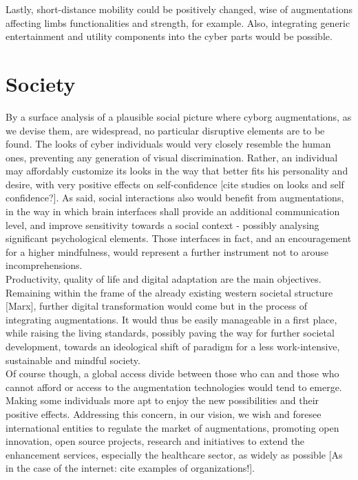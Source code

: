 Lastly, short-distance mobility could be positively changed, wise of augmentations affecting limbs functionalities and strength, for example. Also, integrating generic entertainment and utility components into the cyber parts would be possible.


\section*{Society}
\label{sec:society}

By a surface analysis of a plausible social picture where cyborg augmentations, as we devise them, are widespread, no particular disruptive elements are to be found. The looks of cyber individuals would very closely resemble the human ones, preventing any generation of visual discrimination. Rather, an individual may affordably customize its looks in the way that better fits his personality and desire, with very positive effects on self-confidence [cite studies on looks and self confidence?]. As said, social interactions also would benefit from augmentations, in the way in which brain interfaces shall provide an additional communication level, and improve sensitivity towards a social context - possibly analysing significant psychological elements. Those interfaces in fact, and an encouragement for a higher mindfulness, would represent a further instrument not to arouse incomprehensions.\\

Productivity, quality of life and digital adaptation are the main objectives. Remaining within the frame of the already existing western societal structure [Marx], further digital transformation would come but in the process of integrating augmentations. It would thus be easily manageable in a first place, while raising the living standards, possibly paving the way for further societal development, towards an ideological shift of paradigm for a less work-intensive, sustainable and mindful society.\\

Of course though, a global access divide between those who can and those who cannot afford or access to the augmentation technologies would tend to emerge. Making some individuals more apt to enjoy the new possibilities and their positive effects. Addressing this concern, in our vision, we wish and foresee international entities to regulate the market of augmentations, promoting open innovation, open source projects, research and initiatives to extend the enhancement services, especially the healthcare sector, as widely as possible [As in the case of the internet: cite examples of organizations!].

